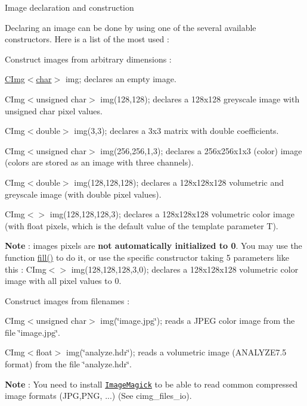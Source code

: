 \begin{DoxyParagraph}{Image declaration and construction}

\end{DoxyParagraph}
Declaring an image can be done by using one of the several available constructors. Here is a list of the most used :


\begin{DoxyItemize}
\item Construct images from arbitrary dimensions :
\begin{DoxyItemize}
\item {\ttfamily \hyperlink{structcimg__library_1_1CImg}{CImg$<$char$>$} img;} declares an empty image.
\item {\ttfamily CImg$<$unsigned char$>$ img(128,128);} declares a 128x128 greyscale image with {\ttfamily unsigned} {\ttfamily char} pixel values.
\item {\ttfamily CImg$<$double$>$ img(3,3);} declares a 3x3 matrix with {\ttfamily double} coefficients.
\item {\ttfamily CImg$<$unsigned char$>$ img(256,256,1,3);} declares a 256x256x1x3 (color) image (colors are stored as an image with three channels).
\item {\ttfamily CImg$<$double$>$ img(128,128,128);} declares a 128x128x128 volumetric and greyscale image (with {\ttfamily double} pixel values).
\item {\ttfamily CImg$<$$>$ img(128,128,128,3);} declares a 128x128x128 volumetric color image (with {\ttfamily float} pixels, which is the default value of the template parameter {\ttfamily T}).
\item {\bfseries Note} : images pixels are {\bfseries not automatically initialized to 0}. You may use the function \hyperlink{structcimg__library_1_1CImg_a494a1e1424510af07e705dfe9b5f78bd}{fill()} to do it, or use the specific constructor taking 5 parameters like this : {\ttfamily CImg$<$$>$ img(128,128,128,3,0);} declares a 128x128x128 volumetric color image with all pixel values to 0.
\end{DoxyItemize}
\end{DoxyItemize}


\begin{DoxyItemize}
\item Construct images from filenames :
\begin{DoxyItemize}
\item {\ttfamily CImg$<$unsigned char$>$ img(\char`\"{}image.jpg\char`\"{});} reads a JPEG color image from the file \char`\"{}image.jpg\char`\"{}.
\item {\ttfamily CImg$<$float$>$ img(\char`\"{}analyze.hdr\char`\"{});} reads a volumetric image (ANALYZE7.5 format) from the file \char`\"{}analyze.hdr\char`\"{}.
\item {\bfseries Note} : You need to install \href{http://www.imagemagick.org}{\tt ImageMagick} to be able to read common compressed image formats (JPG,PNG, ...) (See cimg\_\-files\_\-io).
\end{DoxyItemize}
\end{DoxyItemize}



